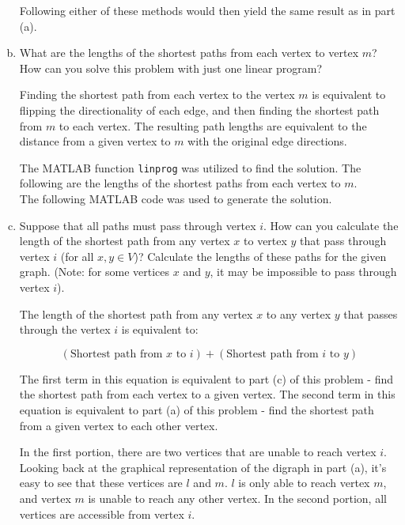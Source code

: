 \documentclass[../report/main.tex]{subfiles}
\begin{document}
\begin{enumerate}[a)]
  Following either of these methods would then yield the same result as in part (a).

  \newpage

	\item What are the lengths of the shortest paths from each vertex to vertex $m$? How can you solve this problem with just one linear program?

  Finding the shortest path from each vertex to the vertex $m$ is equivalent to flipping the directionality of each edge, and then finding the shortest path from $m$ to each vertex. The resulting path lengths are equivalent to the distance from a given vertex to $m$ with the original edge directions.

  The MATLAB function \verb|linprog| was utilized to find the solution. The following are the lengths of the shortest paths from each vertex to $m$.\\
    
  

  The following MATLAB code was used to generate the solution.

  
    
  \newpage

	\item Suppose that all paths must pass through vertex $i$. How can you calculate the length of the shortest path from any vertex $x$ to vertex $y$ that pass through vertex $i$ (for all $x, y \in V$)? Calculate the lengths of these paths for the given graph. (Note: for some vertices $x$ and $y$, it may be impossible to pass through vertex $i$).

  The length of the shortest path from any vertex $x$ to any vertex $y$ that passes through the vertex $i$ is equivalent to:

  \[
    (\text{Shortest path from } x \text{ to } i) + (\text{Shortest path from } i \text{ to } y)
  \]

  The first term in this equation is equivalent to part (c) of this problem - find the shortest path from each vertex to a given vertex. The second term in this equation is equivalent to part (a) of this problem - find the shortest path from a given vertex to each other vertex.

  In the first portion, there are two vertices that are unable to reach vertex $i$. Looking back at the graphical representation of the digraph in part (a), it's easy to see that these vertices are $l$ and $m$. $l$ is only able to reach vertex $m$, and vertex $m$ is unable to reach any other vertex. In the second portion, all vertices are accessible from vertex $i$.


\end{enumerate}
\end{document}
